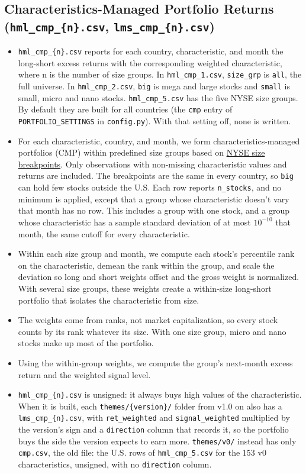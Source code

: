 \documentclass[12pt,title,fleqn]{article}
\begin{document}
\subsection{Characteristics-Managed Portfolio Returns (\texttt{hml\_cmp\_\{n\}.csv}, \texttt{lms\_cmp\_\{n\}.csv})}\label{sec:cmp}
\begin{itemize}
    \item \texttt{hml\_cmp\_\{n\}.csv} reports for each country, characteristic, and month the long-short excess returns with the corresponding weighted characteristic, where n is the number of size groups. In \texttt{hml\_cmp\_1.csv}, \texttt{size\_grp} is \texttt{all}, the full universe. In \texttt{hml\_cmp\_2.csv}, \texttt{big} is mega and large stocks and \texttt{small} is small, micro and nano stocks. \texttt{hml\_cmp\_5.csv} has the five NYSE size groups. By default they are built for all countries (the \texttt{cmp} entry of \texttt{PORTFOLIO\_SETTINGS} in \texttt{config.py}). With that setting off, none is written.
    \item For each characteristic, country, and month, we form characteristics-managed portfolios (CMP) within predefined size groups based on \hyperref[app:nyse-breakpoints]{NYSE size breakpoints}. Only observations with non-missing characteristic values and returns are included. The breakpoints are the same in every country, so \texttt{big} can hold few stocks outside the U.S. Each row reports \texttt{n\_stocks}, and no minimum is applied, except that a group whose characteristic doesn't vary that month has no row. This includes a group with one stock, and a group whose characteristic has a sample standard deviation of at most $10^{-10}$ that month, the same cutoff for every characteristic.
    \item Within each size group and month, we compute each stock's percentile rank on the characteristic, demean the rank within the group, and scale the deviation so long and short weights offset and the gross weight is normalized. With several size groups, these weights create a within-size long-short portfolio that isolates the characteristic from size.
    \item The weights come from ranks, not market capitalization, so every stock counts by its rank whatever its size. With one size group, micro and nano stocks make up most of the portfolio.
    \item Using the within-group weights, we compute the group's next-month excess return and the weighted signal level.
    \item \texttt{hml\_cmp\_\{n\}.csv} is unsigned: it always buys high values of the characteristic. When it is built, each \texttt{themes/\{version\}/} folder from v1.0 on also has a \texttt{lms\_cmp\_\{n\}.csv}, with \texttt{ret\_weighted} and \texttt{signal\_weighted} multiplied by the version's sign and a \texttt{direction} column that records it, so the portfolio buys the side the version expects to earn more. \texttt{themes/v0/} instead has only \texttt{cmp.csv}, the old file: the U.S. rows of \texttt{hml\_cmp\_5.csv} for the 153 v0 characteristics, unsigned, with no \texttt{direction} column.
\end{itemize}
\end{document}
